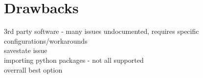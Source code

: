 \section{Drawbacks}
3rd party software - many issues undocumented, requires specific configurations/workarounds
\\ savestate issue
\\importing python packages - not all supported
\\overrall best option